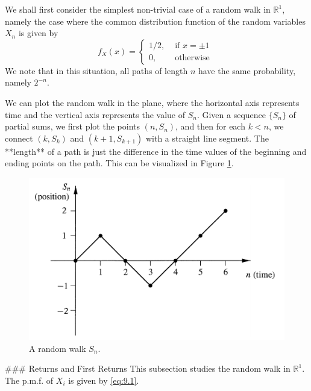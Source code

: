 \begin{example}
We shall first consider the simplest non-trivial case of a random walk in $\mathbb{R}^1$, namely the case where the common distribution function of the random variables $X_n$ is given by
\begin{equation}
    \label{eq:9.1}
    \tag{9-1}
    f_{X}(x)=\left\{\begin{array}{ll}{1 / 2,} & {\text { if } x=\pm 1} \\ {0,} & {\text { otherwise }}\end{array}\right.
\end{equation}
We note that in this situation, all paths of length $n$ have the same probability, namely $2^{-n}$.

We can plot the random walk in the plane, where the horizontal axis represents time and the vertical axis represents the value of $S_n$. Given a sequence $\{S_n\}$ of partial sums, we first plot the points $(n, S_n)$, and then for each $k < n$, we connect $(k, S_k)$ and $(k + 1, S_{k+1})$ with a straight line segment. The **length** of a path is just the difference in the time values of the beginning and ending points on the path. This can be visualized in Figure \ref{fig:9.1}.

\begin{figure}[!htb]
    \centering
    \includegraphics[scale=0.3]{plots/random_walk.png}
    \caption{A random walk $S_n$.}
    \label{fig:9.1}
\end{figure}
\end{example}



### Returns and First Returns
This subsection studies the random walk in $\mathbb{R}^1$. The p.m.f. of $X_i$ is given by \eqref{eq:9.1}.

